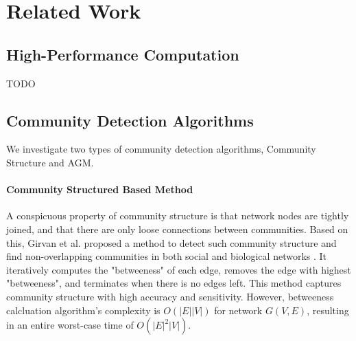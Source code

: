 \section{Related Work}

\subsection{High-Performance Computation}

\par TODO\citep{compiler-for-hpc}

\subsection{Community Detection Algorithms}

\par We investigate two types of community detection algorithms,
Community Structure\citep{girvan2002community}  and AGM\citep{yang2012structure}.

\paragraph{Community Structured Based Method} A conspicuous property of 
community structure is that network nodes are tightly joined, and that
there are only loose connections between communities. Based on this,
Girvan et al. proposed a method to detect such community structure and
find non-overlapping communities in both social and biological networks
\citep{girvan2002community}. It iteratively computes the "betweeness"\citep{freeman1977graph}
of each edge, removes the edge with highest "betweeness", and terminates
when there is no edges left. This method captures community structure
with high accuracy and sensitivity. However, betweeness calcluation algorithm's 
complexity  is $O(|E| |V|)$ for network $G(V,E)$, resulting in an
entire worst-case time of $O(|E|^2 |V|)$.


